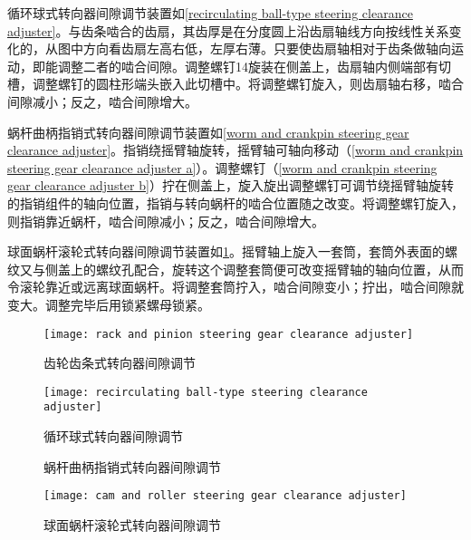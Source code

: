 \documentclass[UTF8]{ctexart}
\numberwithin{figure}{section}
\numberwithin{table}{section}
\begin{document}
循环球式转向器间隙调节装置如\cref{recirculating ball-type steering clearance adjuster}。与齿条啮合的齿扇，其齿厚是在分度圆上沿齿扇轴线方向按线性关系变化的，从图中方向看齿扇左高右低，左厚右薄。只要使齿扇轴相对于齿条做轴向运动，即能调整二者的啮合间隙。调整螺钉14旋装在侧盖上，齿扇轴内侧端部有切槽，调整螺钉的圆柱形端头嵌入此切槽中。将调整螺钉旋入，则齿扇轴右移，啮合间隙减小；反之，啮合间隙增大。

蜗杆曲柄指销式转向器间隙调节装置如\cref{worm and crankpin steering gear clearance adjuster}。指销绕摇臂轴旋转，摇臂轴可轴向移动（\cref{worm and crankpin steering gear clearance adjuster a}）。调整螺钉（\cref{worm and crankpin steering gear clearance adjuster b}）拧在侧盖上，旋入旋出调整螺钉可调节绕摇臂轴旋转的指销组件的轴向位置，指销与转向蜗杆的啮合位置随之改变。将调整螺钉旋入，则指销靠近蜗杆，啮合间隙减小；反之，啮合间隙增大。

球面蜗杆滚轮式转向器间隙调节装置如\cref{cam and roller steering gear clearance adjuster}。摇臂轴上旋入一套筒，套筒外表面的螺纹又与侧盖上的螺纹孔配合，旋转这个调整套筒便可改变摇臂轴的轴向位置，从而令滚轮靠近或远离球面蜗杆。将调整套筒拧入，啮合间隙变小；拧出，啮合间隙就变大。调整完毕后用锁紧螺母锁紧。

\begin{figure}[htbp]
	\centering
	\begin{minipage}[b]{0.4\textwidth}
		\centering
		\texttt{[image: rack and pinion steering gear clearance adjuster]}
		\caption{齿轮齿条式转向器间隙调节}
		\label{rack and pinion steering gear clearance adjuster}
	\end{minipage}
	\begin{minipage}[b]{0.5\textwidth}
		\centering
		\texttt{[image: recirculating ball-type steering clearance adjuster]}
		\caption{循环球式转向器间隙调节}
		\label{recirculating ball-type steering clearance adjuster}
	\end{minipage}
	\begin{minipage}[b]{0.6\textwidth}
		\centering
		\caption{蜗杆曲柄指销式转向器间隙调节}
		\label{worm and crankpin steering gear clearance adjuster}
	\end{minipage}
	\begin{minipage}[b]{0.3\textwidth}
		\centering
		\texttt{[image: cam and roller steering gear clearance adjuster]}
		\caption{球面蜗杆滚轮式转向器间隙调节}
		\label{cam and roller steering gear clearance adjuster}
	\end{minipage}
\end{figure}
\end{document}
